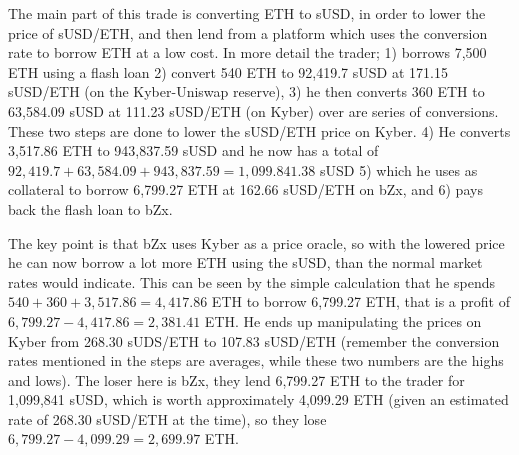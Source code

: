 The main part of this trade is converting ETH to sUSD, in order to
lower the price of sUSD/ETH, and then lend from a platform which uses
the conversion rate to borrow ETH at a low cost. In more detail the
trader; 1) borrows 7,500 ETH using a flash loan 2) convert 540 ETH to
92,419.7 sUSD at 171.15 sUSD/ETH (on the Kyber-Uniswap reserve), 3) he
then converts 360 ETH to 63,584.09 sUSD at 111.23 sUSD/ETH (on Kyber)
over are series of conversions. These two steps are done to
lower the sUSD/ETH price on Kyber. 4) He converts 3,517.86 ETH to
943,837.59 sUSD and he now has a total of
$92,419.7+63,584.09+943,837.59=1,099.841.38$ sUSD 5) which he uses as
collateral to borrow 6,799.27 ETH at 162.66 sUSD/ETH on bZx, and 6)
pays back the flash loan to bZx.

The key point is that bZx uses Kyber as a price oracle, so with the
lowered price he can now borrow a lot more ETH using the sUSD, than the
normal market rates would indicate. This can be seen by the simple
calculation that he spends $540+360+3,517.86=4,417.86$ ETH to borrow
6,799.27 ETH, that is a profit of $6,799.27-4,417.86=2,381.41$ ETH. He
ends up manipulating the prices on Kyber from 268.30 sUDS/ETH to
107.83 sUSD/ETH (remember the conversion rates mentioned in the steps
are averages, while these two numbers are the highs and lows). The
loser here is bZx, they lend 6,799.27 ETH to the trader for 1,099,841
sUSD, which is worth approximately 4,099.29 ETH (given an estimated rate
of 268.30 sUSD/ETH at the time), so they lose $6,799.27-4,099.29=2,699.97$ ETH.

